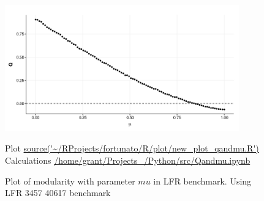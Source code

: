 \begin{figure}
    \centering
    \includegraphics[width=0.9\textwidth]{images/chapter_community_detection/ggplot2/LFR/Rplot_muandq_theme.png}
    \caption[Modularity and $\mu$ for LFR benchmark]{Plot of modularity with parameter $mu$ in LFR benchmark. Using LFR 3457 40617 benchmark}
    \tiny Plot \url{source('~/RProjects/fortunato/R/plot/new_plot_qandmu.R')}
    \tiny Calculations \url{/home/grant/Projects_/Python/src/Qandmu.ipynb}
    \label{fig:modularity_and_mu}
\end{figure}




